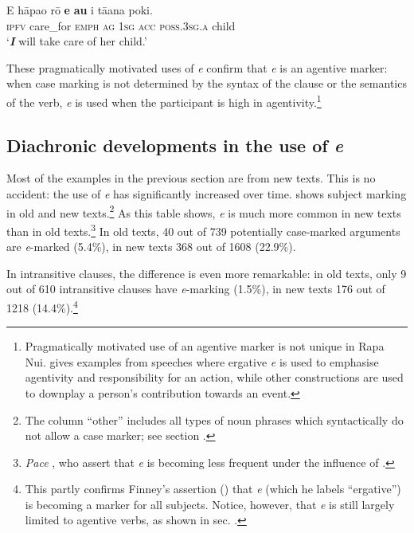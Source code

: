 {\ea\label{ex:8.23}
\gll E hāpa{\ꞌ}o rō \textbf{e} \textbf{au} i tā{\ꞌ}ana poki.\\
\textsc{ipfv} care\_for \textsc{emph} \textsc{ag} \textsc{1sg} \textsc{acc} \textsc{poss.3sg.a} child\\

\glt
‘\textit{\textbf{I}} will take care of her child.’ \textstyleExampleref{[R229.081]} 
\z

These pragmatically motivated uses of \textit{e} confirm that \textit{e} is an agentive marker: when case marking is not determined by the syntax of the clause or the semantics of the verb, \textit{e} is used when the participant is high in agentivity.\footnote{\label{fn:400}Pragmatically motivated use of an agentive marker is not unique in Rapa Nui. \citet{Duranti1990,Duranti1994} gives examples from  speeches where ergative \textit{e} is used to emphasise agentivity and responsibility for an action, while other constructions are used to downplay a person’s contribution towards an event.}

\subsection[Diachronic developments in the use of e]{Diachronic developments in the use of \textit{e}}\label{sec:8.3.1.5}


Most of the examples in the previous section are from new texts. This is no accident: the use of \textit{e} has significantly increased over time.  shows subject marking in old and new texts.\footnote{\label{fn:401}The column “other” includes all types of noun phrases which syntactically do not allow a case marker; see section .} As this table shows, \textit{e} is much more common in new texts than in old texts.\footnote{\label{fn:402}\textit{Pace} \citet[31]{FinneyAlexander1998}, who assert that \textit{e} is becoming less frequent under the influence of .}  In old texts, 40 out of 739 potentially case-marked arguments are \textit{e}{}-marked (5.4\%), in new texts 368 out of 1608 (22.9\%). 
\newpage 

In intransitive clauses, the difference is even more remarkable: in old texts, only 9 out of 610 intransitive clauses have \textit{e}{}-marking (1.5\%), in new texts 176 out of 1218 (14.4\%).\footnote{\label{fn:403}This partly confirms Finney’s assertion (\citealt[409]{Finney2001}) that \textit{e} (which he labels “ergative”) is becoming a marker for all subjects. Notice, however, that \textit{e} is still largely limited to agentive verbs, as shown in sec. .} 

}
